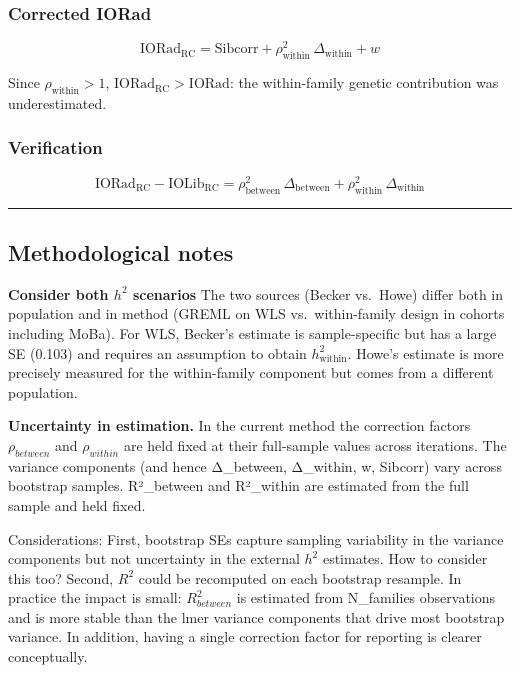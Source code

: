 \documentclass[
]{article}
\begin{document}
\subsubsection{Corrected IORad}\label{corrected-iorad}

\[\text{IORad}_\text{RC} = \text{Sibcorr} + \rho^2_\text{within}\,\Delta_\text{within} + w\]

Since \(\rho_\text{within} > 1\),
\(\text{IORad}_\text{RC} > \text{IORad}\): the within-family genetic
contribution was underestimated.

\subsubsection{Verification}\label{verification}

\[\text{IORad}_\text{RC} - \text{IOLib}_\text{RC} = \rho^2_\text{between}\,\Delta_\text{between} + \rho^2_\text{within}\,\Delta_\text{within}\]

\begin{center}\rule{0.5\linewidth}{0.5pt}\end{center}

\subsection{Methodological notes}\label{methodological-notes}

\textbf{Consider both \(h^2\) scenarios} The two sources (Becker
vs.~Howe) differ both in population and in method (GREML on WLS
vs.~within-family design in cohorts including MoBa). For WLS, Becker's
estimate is sample-specific but has a large SE (0.103) and requires an
assumption to obtain \(h^2_\text{within}\). Howe's estimate is more
precisely measured for the within-family component but comes from a
different population.

\textbf{Uncertainty in estimation.} In the current method the correction
factors \(\rho_{between}\) and \(\rho_{within}\) are held fixed at their
full-sample values across iterations. The variance components (and hence
Δ\_between, Δ\_within, w, Sibcorr) vary across bootstrap samples.
R²\_between and R²\_within are estimated from the full sample and held
fixed.

Considerations: First, bootstrap SEs capture sampling variability in the
variance components but not uncertainty in the external \(h^2\)
estimates. How to consider this too? Second, \(R^2\) could be recomputed
on each bootstrap resample. In practice the impact is small:
\(R^2_{between}\) is estimated from N\_families observations and is more
stable than the lmer variance components that drive most bootstrap
variance. In addition, having a single correction factor for reporting
is clearer conceptually.
\end{document}
